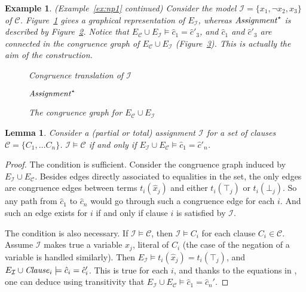 \documentclass{easychair}
\newtheorem{example}{Example}
\newtheorem{lemma}{Lemma}
\begin{document}
\begin{example}\label{ex:np2} (Example~\ref{ex:np1} continued)  
Consider the model $\mathcal{I} = \{x_1, \neg x_2, x_3\}$ of\/ $\mathcal{C}$.
Figure~\ref{fig:npassignment} gives a graphical representation of
$E_{\mathcal{I}}$, whereas ${\it Assignment}^\star$ is described by
Figure~\ref{fig:npassignmentstar}.  Notice that
$E_{\mathcal{C}} \cup E_{\mathcal{I}} \models \hat{c}_1 = \hat{c}'_3$,
and $\hat{c}_1$ and $\hat{c}'_3$ are connected in the congruence graph
of $E_{\mathcal{C}} \cup E_{\mathcal{I}}$ (Figure~\ref{fig:npmodel}).
This is actually the aim of the construction.

\begin{figure}[ht]

\caption{Congruence translation of $\mathcal{I}$}
\label{fig:npassignment}
\end{figure}

\begin{figure}[ht]

\caption{${\it Assignment}^\star$}
\label{fig:npassignmentstar}
\end{figure}
\begin{figure}[ht]

\caption{The congruence graph for $E_{\mathcal{C}} \cup E_{\mathcal{I}}$}
\label{fig:npmodel}
\end{figure}
\end{example}

\begin{lemma}
\label{lemma:eqv}
Consider a (partial or total) assignment $\mathcal{I}$ for a set of clauses
$\mathcal{C}= \{C_1, \dots C_n\}$.  $\mathcal{I} \models \mathcal{C}$ if and only if
$E_{\mathcal{I}} \cup E_\mathcal{C} \models \hat{c}_1 = \hat{c}'_n$.
\end{lemma}
\begin{proof}
The condition is sufficient.  Consider the congruence graph induced by
$E_{\mathcal{I}} \cup E_\mathcal{C}$.  Besides edges directly associated to
equalities in the set, the only edges are congruence edges between terms
$t_i(\hat{x}_j)$ and either $t_i(\top_j)$ or $t_i(\bot_j)$.  So any path from
$\hat{c}_1$ to $\hat{c}_n$ would go through such a congruence edge for each $i$.
And such an edge exists for $i$ if and only if clause $i$ is satisfied by
$\mathcal{I}$.

The condition is also necessary.  If $\mathcal{I} \models \mathcal{C}$, then
$\mathcal{I} \models C_i$ for each clause $C_i \in \mathcal{C}$.  Assume
$\mathcal{I}$ makes true a variable $x_j$, literal of $C_i$ (the case of
the negation of a variable is handled similarly).  Then $E_{\mathcal{I}} \models
t_i(\hat{x}_j) = t_i(\top_j)$, and $E_{\mathcal{I}} \cup {\it Clause}_i
\models \hat{c}_i = \hat{c}_i'$.  This is true for each $i$, and
thanks to the equations in \Connect, one can deduce using transitivity that
$E_{\mathcal{I}} \cup E_\mathcal{C} \models \hat{c}_1 = \hat{c}_n'$.
\end{proof}
\end{document}
